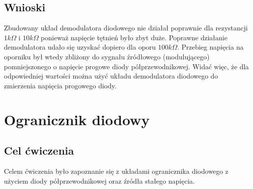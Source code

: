 \documentclass[11pt]{article}
\begin{document}
\subsection{Wnioski}
Zbudowany układ demodulatora diodowego nie działał poprawnie dla rezystancji $1k\Omega$ i $10k\Omega$ ponieważ napięcie tętnień było zbyt duże. Poprawne działanie demodulatora udało się uzyskać dopiero dla oporu $100k\Omega$. Przebieg napięcia na oporniku był wtedy zbliżony do sygnału źródłowego (modulującego) 
pomniejszonego o napięcie progowe diody półprzewodnikowej. Widać więc, że dla odpowiedniej wartości można użyć układu demodulatora diodowego do zmierzenia napięcia progowego diody.
\section{Ogranicznik diodowy}
\subsection{Cel ćwiczenia}
Celem ćwiczenia było zapoznanie się z układami ogranicznika diodowego z użyciem diody półprzewodnikowej oraz źródła stałego napięcia.
\end{document}
